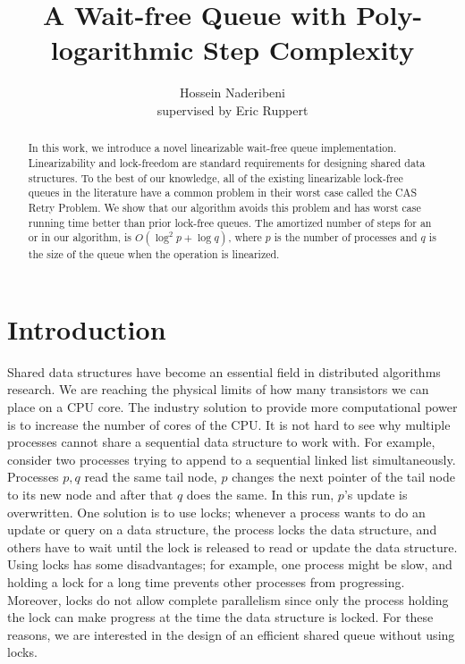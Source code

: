 \documentclass[10pt]{article}
\newcommand{\nf}[1]{{\normalfont{\texttt{#1}}}}
\theoremstyle{definition}
\begin{document}
\title{A Wait-free Queue with Poly-logarithmic Step Complexity}
\author{Hossein Naderibeni \\supervised by Eric Ruppert}
\maketitle

\begin{abstract}
In this work, we introduce a novel linearizable wait-free queue implementation.
Linearizability and lock-freedom are standard requirements for designing shared data structures. To the best of our knowledge, all of the existing linearizable lock-free queues in the literature have a common problem in their worst case called the CAS Retry Problem. We show that our algorithm avoids this problem and has worst case running time better than prior lock-free queues. The amortized number of steps for an \nf{Enqueue} or \nf{Dequeue} in our algorithm, is $O(\log^2 p + \log q)$,  where $p$ is the number of processes and $q$ is the size of the queue when the operation is linearized.
\end{abstract}

\tableofcontents
\pagebreak
\section{Introduction}
Shared data structures have become an essential field in distributed algorithms research.
We are reaching the physical limits of how many transistors we can place on a CPU core. The industry solution to provide more computational power is to increase the number of cores of the CPU. It is not hard to see why multiple processes cannot share a sequential data structure to work with. For example, consider two processes trying to append to a sequential linked list simultaneously. Processes $p,q$ read the same tail node, $p$ changes the next pointer of the tail node to its new node and after that $q$ does the same. In this run, $p$'s update is overwritten. One solution is to use locks; whenever a process wants to do an update or query on a data structure, the process locks the data structure, and others have to wait until the lock is released to read or update the data structure. Using locks has some disadvantages; for example, one process might be slow, and holding a lock for a long time prevents other processes from progressing. Moreover, locks do not allow complete parallelism since only the process holding the lock can make progress at the time the data structure is locked. For these reasons, we are interested in the design of an efficient shared queue without using locks.
\end{document}
